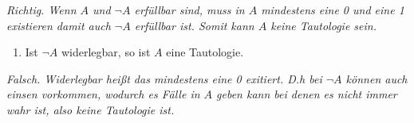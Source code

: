 \textit{Richtig. Wenn $A$ und $\lnot A$ erfüllbar sind, muss in $A$ mindestens eine 0 und eine 1 existieren damit auch $\lnot A$ erfüllbar ist. Somit kann $A$ keine Tautologie sein.}

\begin{enumerate}[label={f)}, leftmargin=*]
\item Ist $\lnot A$ widerlegbar, so ist $A$ eine Tautologie.
\end{enumerate}

\textit{Falsch. Widerlegbar heißt das mindestens eine 0 exitiert. D.h bei $\lnot A$ können auch einsen vorkommen, wodurch es Fälle in $A$ geben kann bei denen es nicht immer wahr ist, also keine Tautologie ist.}
